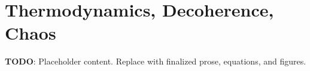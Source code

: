 
\section{Thermodynamics, Decoherence, Chaos}
\label{sec:thermodynamics-decoherence-chaos}

\textbf{TODO}: Placeholder content. Replace with finalized prose, equations, and figures.

